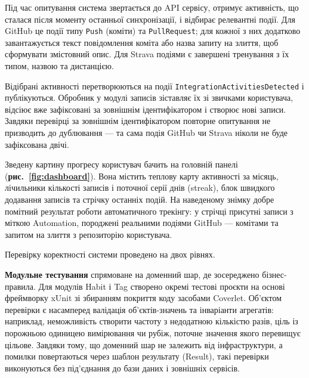 Під час опитування система звертається до API сервісу, отримує активність, що сталася після моменту останньої синхронізації, і відбирає релевантні події. Для GitHub це події типу \texttt{Push} (коміти) та \texttt{PullRequest}; для кожної з них додатково завантажується текст повідомлення коміта або назва запиту на злиття, щоб сформувати змістовний опис. Для Strava подіями є завершені тренування з їх типом, назвою та дистанцією.

Відібрані активності перетворюються на події \texttt{IntegrationActivitiesDetected} і публікуються. Обробник у модулі записів зіставляє їх зі звичками користувача, відсіює вже зафіксовані за зовнішнім ідентифікатором і створює нові записи. Завдяки перевірці за зовнішнім ідентифікатором повторне опитування не призводить до дублювання — та сама подія GitHub чи Strava ніколи не буде зафіксована двічі.


Зведену картину прогресу користувач бачить на головній панелі (\textbf{рис.~\ref{fig:dashboard}}). Вона містить теплову карту активності за місяць, лічильники кількості записів і поточної серії днів (streak), блок швидкого додавання записів та стрічку останніх подій. На наведеному знімку добре помітний результат роботи автоматичного трекінгу: у стрічці присутні записи з міткою Automation, породжені реальними подіями GitHub — комітами та запитом на злиття з репозиторію користувача.



Перевірку коректності системи проведено на двох рівнях.

\textbf{Модульне тестування} спрямоване на доменний шар, де зосереджено бізнес-правила. Для модулів Habit і Tag створено окремі тестові проєкти на основі фреймворку xUnit зі збиранням покриття коду засобами Coverlet. Об'єктом перевірки є насамперед валідація об'єктів-значень та інваріанти агрегатів: наприклад, неможливість створити частоту з недодатною кількістю разів, ціль із порожньою одиницею вимірювання чи рубіж, поточне значення якого перевищує цільове. Завдяки тому, що доменний шар не залежить від інфраструктури, а помилки повертаються через шаблон результату (Result), такі перевірки виконуються без під'єднання до бази даних і зовнішніх сервісів.

